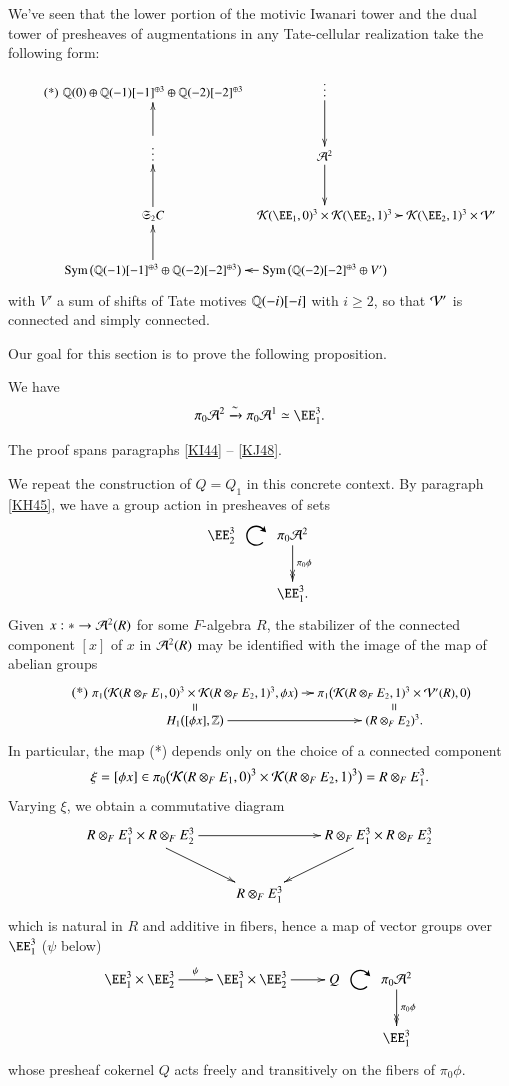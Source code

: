 \sspar{}
\label{KH45}
We've seen that the lower portion of the motivic Iwanari tower and the dual tower of presheaves of augmentations in any Tate-cellular realization take the following form:
\[
\begin{small}
\tag{*}
\xymatrix
@ C = 1ex
{
\QQ(0) \oplus \QQ(-1)[-1]^{\oplus 3} \oplus \QQ(-2)[-2]^{\oplus 3} 
& \vdots \ar[d] 
\\
\vdots \ar[u] & \Aa^2 \ar[d]  
\\
\fkS_2 C \ar[u] &  
\Kk (\EE_1, 0)^3 \times \Kk (\EE_2, 1)^3 \ar[r] 
& \Kk (\EE_2, 1)^3 \times \Vv' 
\\
\Sym \big( \QQ(-1)[-1]^{\oplus 3} \oplus \QQ(-2)[-2]^{\oplus 3} \big) \ar[u] 
& \Sym \big( \QQ(-2)[-2]^{\oplus 3} \oplus V' \big) \ar[l]  
}
\end{small}
\]
with $V'$ a sum of shifts of Tate motives $\mathbb{Q}(-i)[-i]$ with $i \ge 2$, so that $\mathcal{V}'$ is connected and simply connected. 

Our goal for this section is to prove the following proposition. 

\begin{ssProposition}
\label{KL57}
We have
\[
\pi_0 \Aa^2 \xto{\sim} \pi_0 \Aa^1 \simeq \EE_1^3.
\]
\end{ssProposition}

The proof spans paragraphs \ref{KI44} -- \ref{KJ48}.


\sspar{}
\label{KI44}
We repeat the construction of $Q=Q_1$ in this concrete context. By paragraph \ref{KH45}, we have a group action in presheaves of sets
\[
\xymatrix{
\EE_2^3 
\ar@{}[r]|-{\rotatebox{-90}{\scalebox{2}{$\circlearrowright$}}}
&
\pi_0\Aa^2 \ar@{->>}[d]^-{\pi_0\phi}
\\
& \EE_1^3.
}
\]
Given $x: \ast \to \mathcal{A}^2(R)$ for some $F$-algebra $R$, the stabilizer of the connected component $[x]$ of $x$ in $\mathcal{A}^2(R)$ may be identified with the image of the map of abelian groups 
\[
\tag{*}
\begin{small}
\xymatrix
@R = 1ex @C = 2ex
{
\pi_1 \big( \Kk (R \otimes_F E_1, 0)^3 \times 
\Kk (R \otimes_F E_2, 1)^3, \phi x \big)
\ar[r] \ar@{=}[d]
&
\pi_1 \big( \Kk ( R\otimes_F E_2, 1)^3 \times \Vv'(R), 0 \big)
\ar@{=}[d]
\\
H_1 \big( [\phi x], \ZZ \big)
\ar[r]
&
(R \otimes_F E_2)^3.
}
\end{small}
\]
In particular, the map (*) depends only on the choice of a connected component
\[
\xi = [\phi x] \in \pi_0
\big( \mathcal{K} (R \otimes_F E_1, 0)^3 
\times \mathcal{K} (R \otimes_F E_2, 1)^3\big)
= R \otimes_F E^3_1. 
\]
Varying $\xi$, we obtain a commutative diagram
\[
\xymatrix{
R \otimes_F E_1^3 \times R \otimes_F E_2^3
\ar[rr] \ar[dr]
&&
R \otimes_F E_1^3 \times R \otimes_F E_2^3
\ar[dl]
\\
& 
R \otimes_F E_1^3 
}
\]
which is natural in $R$ and additive in fibers, hence a map of vector groups over $\EE_1^3$ ($\psi$ below)
\[
\xymatrix{
\EE^3_1 \times \EE_2^3
\ar[r]^-\psi
&
\EE^3_1 \times \EE_2^3 
\ar[r]
&
Q
\ar@{}[r]|-{\rotatebox{-90}{\scalebox{2}{$\circlearrowright$}}}
&
\pi_0\Aa^2 \ar@{->>}[d]^-{\pi_0\phi}
\\
&&& \EE_1^3
}
\]
whose presheaf cokernel $Q$ acts freely and transitively on the fibers of $\pi_0 \phi$.  


